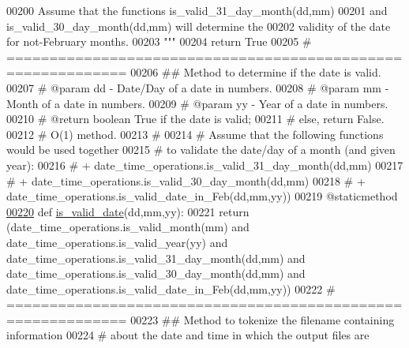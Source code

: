 \begin{DoxyCode}
00200 \textcolor{stringliteral}{                Assume that the functions is\_valid\_31\_day\_month(dd,mm)}
00201 \textcolor{stringliteral}{                    and is\_valid\_30\_day\_month(dd,mm) will determine the}
00202 \textcolor{stringliteral}{                    validity of the date for not-February months.}
00203 \textcolor{stringliteral}{            """}
00204             \textcolor{keywordflow}{return} \textcolor{keyword}{True}
00205     \textcolor{comment}{# ============================================================}
00206     \textcolor{comment}{##  Method to determine if the date is valid.}
00207     \textcolor{comment}{#   @param dd - Date/Day of a date in numbers.}
00208     \textcolor{comment}{#   @param mm - Month of a date in numbers.}
00209     \textcolor{comment}{#   @param yy - Year of a date in numbers.}
00210     \textcolor{comment}{#   @return boolean True if the date is valid;}
00211     \textcolor{comment}{#       else, return False.}
00212     \textcolor{comment}{#   O(1) method.}
00213     \textcolor{comment}{#}
00214     \textcolor{comment}{#   Assume that the following functions would be used together}
00215     \textcolor{comment}{#       to validate the date/day of a month (and given year):}
00216     \textcolor{comment}{#       + date\_time\_operations.is\_valid\_31\_day\_month(dd,mm)}
00217     \textcolor{comment}{#       + date\_time\_operations.is\_valid\_30\_day\_month(dd,mm)}
00218     \textcolor{comment}{#       + date\_time\_operations.is\_valid\_date\_in\_Feb(dd,mm,yy))}
00219     @staticmethod
\hypertarget{date__time__processing_8py_source_l00220}{}\hyperlink{classutilities_1_1date__time__processing_1_1date__time__operations_acfa0ace983c6e5e715ee0fdb1a9a590b}{00220}     \textcolor{keyword}{def }\hyperlink{classutilities_1_1date__time__processing_1_1date__time__operations_acfa0ace983c6e5e715ee0fdb1a9a590b}{is\_valid\_date}(dd,mm,yy):
00221         \textcolor{keywordflow}{return} (date\_time\_operations.is\_valid\_month(mm) \textcolor{keywordflow}{and} date\_time\_operations.is\_valid\_year(yy) \textcolor{keywordflow}{and} 
      date\_time\_operations.is\_valid\_31\_day\_month(dd,mm) \textcolor{keywordflow}{and} date\_time\_operations.is\_valid\_30\_day\_month(dd,mm) \textcolor{keywordflow}{and} 
      date\_time\_operations.is\_valid\_date\_in\_Feb(dd,mm,yy))
00222     \textcolor{comment}{# ============================================================}
00223     \textcolor{comment}{##  Method to tokenize the filename containing information}
00224     \textcolor{comment}{#       about the date and time in which the output files are}

\end{DoxyCode}
